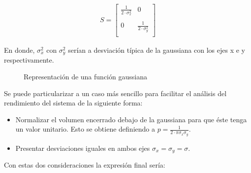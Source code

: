 \begin{equation}
		\begin{aligned}
	S= 	
	\begin{bmatrix}
		\frac{1}{2\cdot{\sigma^{2}_{x}}} & 0\\\\
		0 & \frac{1}{2\cdot{\sigma^{2}_{y}}}\\
	\end{bmatrix}
	\end{aligned}
\end{equation}

En donde, $\sigma^{2}_{x}$ con $\sigma^{2}_{y}$ serían a desviación típica de la gaussiana con los ejes x e y respectivamente.

\begin{figure}[htb]
  \begin{center}
    \caption{Representación de una función gaussiana}
    \label{FunGauss}
  \end{center}
\end{figure}

Se puede particularizar a un caso más sencillo para facilitar el análisis del rendimiento del sistema de la siguiente forma:

\begin{itemize}
	\item Normalizar el volumen encerrado debajo de la gaussiana para que éste tenga un valor unitario. Esto se obtiene definiendo a $p=\frac{1}{2\cdot{\pi}\sigma_{x}\sigma_{y}}$.
	\item Presentar desviaciones iguales en ambos ejes $\sigma_{x}=\sigma_{y}=\sigma$.
\end{itemize}
\newpage
Con estas dos consideraciones la expresión final sería:

